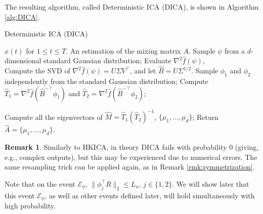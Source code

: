 \documentclass[jmlr]{article}
\newcommand{\Ephi}{\mathcal{E}_{\phi}}
\newcommand{\cN}{\cal{N}}
\theoremstyle{definition}
\newtheorem{remark}[lemma]{Remark}
\begin{document}
The resulting algorithm, called Deterministic ICA (DICA), is shown in Algorithm \ref{alg:DICA}. 
\begin{algorithm}
\caption{Deterministic ICA (DICA)}
\label{alg:DICA}
\begin{algorithmic}[1]
\INPUT $x(t)$ for $1\le t \le T$. 
\OUTPUT An estimation of the mixing matrix $A$. 
\STATE Sample $\psi$ from a $d$-dimensional standard Gaussian distribution;
\STATE Evaluate $\nabla^2\hat{f}(\psi)$, \\
\STATE Compute the SVD of $\nabla^2\hat{f}(\psi) = U \Sigma V^{\top}$, and let $\hat{B} =  U \Sigma^{1/2}$.
\STATE Sample $\phi_1$ and $\phi_2$ independently from the standard Gaussian distribution;
\STATE Compute $\hat{T}_1 =\nabla^2\hat{f}(\hat{B}^{-\top}\phi_1)$ and  $\hat{T}_2 =\nabla^2\hat{f}(\hat{B}^{-\top}\phi_2)$;

\STATE Compute all the eigenvectors of $\hat{M} = \hat{T}_1\left(\hat{T}_2\right)^{-1}$, $\{\mu_1,\ldots,\mu_d\}$;
\STATE Return $\hat{A} = \{\mu_1,\ldots,\mu_d\}$.
\end{algorithmic}
\end{algorithm}
\begin{remark}
Similarly to HKICA, in theory DICA fails with probability 0 (giving, e.g., complex outputs), but this may be experienced due to numerical errors.
The same resampling trick can be applied again, as in Remark \ref{rmk:symmetrization}. 
\end{remark}
Note that on the event $\Ephi$, $\|\phi_j^{\top}R\|_2\le L_u$, $j\in\{1,2\}$. 
We will show later that this event $\Ephi$, as well as other events defined later, will hold simultaneously with high probability.
\end{document}

